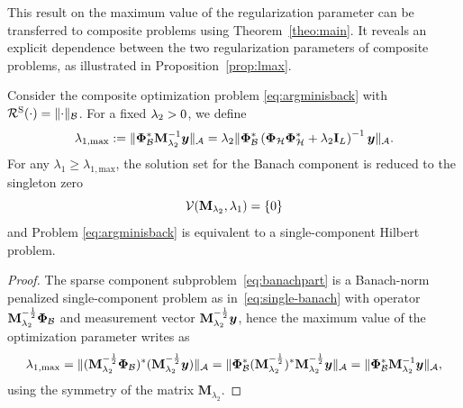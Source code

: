\documentclass[12pt]{article}
\begin{document}
    This result on the maximum value of the regularization parameter can be transferred to composite problems using Theorem~\ref{theo:main}. It reveals an explicit dependence between the two regularization parameters of composite problems, as illustrated in Proposition~\ref{prop:lmax}.

    \begin{proposition}
    \label{prop:lmax}
    Consider the composite optimization problem \eqref{eq:argminisback} with $\mathcal{R}^\mathrm{S}(\cdot) = \lVert \cdot \rVert_\mathcal{B}$. For a fixed $\lambda_{2} >0$, we define
    \begin{equation}
        \label{eq:l1max}
        \lambda_{1, \mathrm{max}} := \lVert \bm{\Phi}_\mathcal{B}^* \mathbf{M}_{\lambda_2}^{-1} \bm{y} \rVert_{\mathcal{A}} = \lambda_2 \lVert \bm{\Phi}_\mathcal{B}^* \left( \bm{\Phi}_\mathcal{H} \bm{\Phi}_\mathcal{H}^* + \lambda_2 \mathbf{I}_L \right)^{-1} \bm{y} \rVert_{\mathcal{A}}.
    \end{equation}
    For any $\lambda_1 \geq \lambda_{1, \mathrm{max}}$, the solution set for the Banach component is reduced to the singleton zero 
    $$\mathcal{V}(\mathbf{M}_{\lambda_{2}}, \lambda_{1}) = \left\{ 0 \right\}$$
    and Problem \eqref{eq:argminisback} is equivalent to a single-component Hilbert problem.
    \end{proposition}

    \begin{proof}
        The sparse component subproblem~\eqref{eq:banachpart} is a Banach-norm penalized single-component problem as in~\eqref{eq:single-banach} with operator $\mathbf{M}_{\lambda_{2}}^{-\frac{1}{2}} \bm{\Phi}_\mathcal{B}$ and measurement vector $\mathbf{M}_{\lambda_{2}}^{-\frac{1}{2}}\bm{y}$, hence the maximum value of the optimization parameter writes as
        \begin{equation*}
            \lambda_{1, \mathrm{max}} = \lVert (\mathbf{M}_{\lambda_{2}}^{-\frac{1}{2}} \bm{\Phi}_\mathcal{B})^*  (\mathbf{M}_{\lambda_{2}}^{-\frac{1}{2}} \bm{y}) \rVert_{\mathcal{A}} = \lVert \bm{\Phi}_\mathcal{B}^* (\mathbf{M}_{\lambda_{2}}^{-\frac{1}{2}})^* \mathbf{M}_{\lambda_{2}}^{-\frac{1}{2}} \bm{y} \rVert_{\mathcal{A}} = \lVert \bm{\Phi}_\mathcal{B}^* \mathbf{M}_{\lambda_2}^{-1} \bm{y} \rVert_{\mathcal{A}},
        \end{equation*}
        using the symmetry of the matrix $\mathbf{M}_{\lambda_2}$.
    \end{proof}
\end{document}
